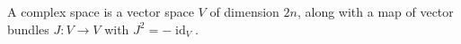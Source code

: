 
 
 A complex space is a vector space $V$ of dimension $2n$, along with a map of vector bundles $J: V\to V$ with $J^2=-\operatorname{id}_V$. 

 